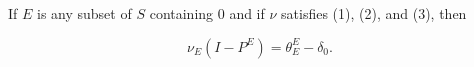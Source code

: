 If $E$ is any subset of $S$ containing 0 and if $\nu$ satisfies (1), (2), and (3), then

$$\nu_E(I - P^E) = \theta^E_E - \delta_0.$$
